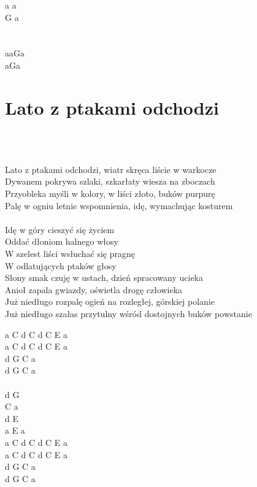 \documentclass[a5paper, 10pt]{book}
\begin{document}
\begin{minipage}[t]{0.1\textwidth}
  a a\\
  G a\\
  ~\\
  ~\\

  aaGa \\ aGa\\

\end{minipage}

\newpage
\section{Lato z ptakami odchodzi}\textcolor{lightgray}{\textit{}}\\~\\
\begin{minipage}[t]{0.8\textwidth}
  Lato z ptakami odchodzi, wiatr skręca liście w warkocze\\
  Dywanem pokrywa szlaki, szkarłaty wiesza na zboczach\\
  Przyobleka myśli w kolory, w liści złoto, buków purpurę\\
  Palę w ogniu letnie wspomnienia, idę, wymachując kosturem\\
  \\
  \hspace*{5mm}Idę w góry cieszyć się życiem\\
  \hspace*{5mm}Oddać dłoniom halnego włosy\\
  \hspace*{5mm}W szelest liści wsłuchać się pragnę\\
  \hspace*{5mm}W odlatujących ptaków głosy\\

  Słony smak czuję w ustach, dzień spracowany ucieka\\
  Anioł zapala gwiazdy, oświetla drogę człowieka\\
  Już niedługo rozpalę ogień na rozległej, górskiej polanie\\
  Już niedługo szałas przytulny wśród dostojnych buków powstanie\\

\end{minipage}
\begin{minipage}[t]{0.2\textwidth}
  a C d C d C E a\\
  a C d C d C E a\\
  d G C a \\
  d G C a \\
  \\
  d G\\
  C a\\
  d E\\
  a E a\\

  a C d C d C E a\\
  a C d C d C E a\\
  d G C a \\
  d G C a \\
\end{minipage}
\end{document}
